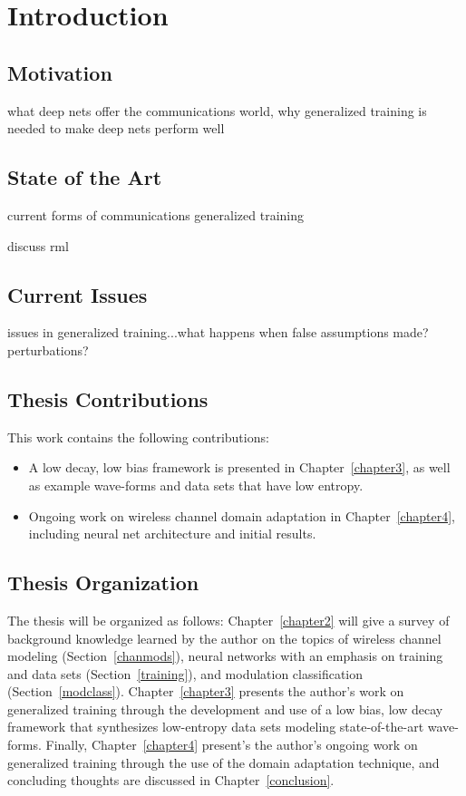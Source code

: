 \chapter{Introduction}
\label{ch:introduction}
\section{Motivation}
what deep nets offer the communications world, why generalized training is needed to make deep nets perform well

\section{State of the Art}
current forms of communications generalized training

discuss rml

\section{Current Issues}
issues in generalized training...what happens when false assumptions made? perturbations?	

\section{Thesis Contributions}
This work contains the following contributions:
\begin{itemize}
\item A low decay, low bias framework is presented in Chapter~\ref{chapter3}, as well as example wave-forms and data sets that have low entropy.
\item Ongoing work on wireless channel domain adaptation in Chapter~\ref{chapter4}, including neural net architecture and initial results.
\end{itemize}

\section{Thesis Organization}
The thesis will be organized as follows: Chapter~\ref{chapter2} will give a survey of background knowledge learned by the author on the topics of wireless channel modeling (Section~\ref{chanmods}), neural networks with an emphasis on training and data sets (Section~\ref{training}), and modulation classification (Section~\ref{modclass}). Chapter~\ref{chapter3} presents the author's work on generalized training through the development and use of a low bias, low decay framework that synthesizes low-entropy data sets modeling state-of-the-art wave-forms. Finally, Chapter~\ref{chapter4} present's the author's ongoing work on generalized training through the use of the domain adaptation technique, and concluding thoughts are discussed in Chapter~\ref{conclusion}.

